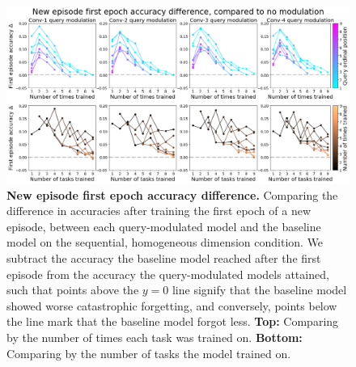 \begin{figure}[!htb]
\centering
\includegraphics[width=\linewidth]{ch-results/figures/query_mod_benchmark/first_task_accuracy_comparison.png}
\caption[New episode first epoch accuracy difference.]{ {\bf New episode first epoch accuracy difference.} Comparing the difference in accuracies after training the first epoch of a new episode, between each query-modulated model and the baseline model on the sequential, homogeneous dimension condition. We subtract the accuracy the baseline model reached after the first episode from the accuracy the query-modulated models attained, such that points above the $y=0$ line signify that the baseline model showed worse catastrophic forgetting, and conversely, points below the line mark that the baseline model forgot less. \textbf{Top:} Comparing by the number of times each task was trained on. \textbf{Bottom:} Comparing by the number of tasks the model trained on. }
\label{fig:results-query-mod-benchmark-first-task-accuracy-comparison}
\end{figure}

